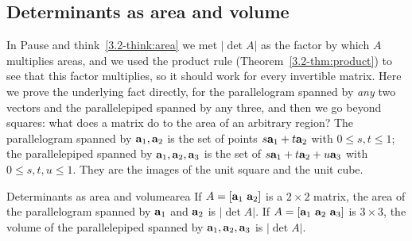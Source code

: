 \documentclass[11pt]{article}
\begin{document}
\subsection*{Determinants as area and volume}

In Pause and think~\ref{3.2-think:area} we met $|\det A|$ as the factor by which $A$ multiplies areas, and we used the product rule (Theorem~\ref{3.2-thm:product}) to see that this factor multiplies, so it should work for every invertible matrix. Here we prove the underlying fact directly, for the parallelogram spanned by \emph{any} two vectors and the parallelepiped spanned by any three, and then we go beyond squares: what does a matrix do to the area of an arbitrary region? The parallelogram spanned by $\mathbf{a}_1,\mathbf{a}_2$ is the set of points $s\mathbf{a}_1+t\mathbf{a}_2$ with $0\leq s,t\leq1$; the parallelepiped spanned by $\mathbf{a}_1,\mathbf{a}_2,\mathbf{a}_3$ is the set of $s\mathbf{a}_1+t\mathbf{a}_2+u\mathbf{a}_3$ with $0\leq s,t,u\leq1$. They are the images of the unit square and the unit cube.

\begin{thm}{Determinants as area and volume}{area}
If $A=[\mathbf{a}_1\ \mathbf{a}_2]$ is a $2\times2$ matrix, the area of the parallelogram spanned by $\mathbf{a}_1$ and $\mathbf{a}_2$ is $|\det A|$. If $A=[\mathbf{a}_1\ \mathbf{a}_2\ \mathbf{a}_3]$ is $3\times3$, the volume of the parallelepiped spanned by $\mathbf{a}_1,\mathbf{a}_2,\mathbf{a}_3$ is $|\det A|$.
\end{thm}
\end{document}
